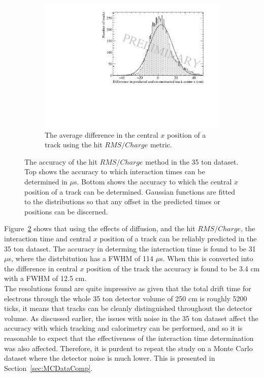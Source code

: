 \begin{figure}[h!]
  \begin{subfigure}{0.6\textwidth}
    \centering
    \includegraphics[width=\textwidth]{Data_AvXPosDiff_RMS_Int}
    \caption{The average difference in the central $x$ position of a track using the hit $RMS/Charge$ metric.}
    \label{fig:DiffDataAvDiff_RMS_Int_X}
  \end{subfigure}
  \caption[The accuracy of the hit $RMS/Charge$ method in the 35 ton dataset]
          {The accuracy of the hit $RMS/Charge$ method in the 35 ton dataset. Top shows the accuracy to which interaction times can be determined in $\mu$s. Bottom shows the accuracy to which the central $x$ position of a track can be determined. Gaussian functions are fitted to the distributions so that any offset in the predicted times or positions can be discerned.}
  \label{fig:DiffDataAvDiff_RMS_Int}
\end{figure}

Figure~\ref{fig:DiffDataAvDiff_RMS_Int} shows that using the effects of diffusion, and the hit $RMS/Charge$, the interaction time and central $x$ position of a track can be reliably predicted in the 35 ton dataset. The accuracy in determing the interaction time is found to be 31 $\mu$s, where the distrbitution has a FWHM of 114 $\mu$s. When this is converted into the difference in central $x$ position of the track the accuracy is found to be 3.4 cm with a FWHM of 12.5 cm. \\

The resolutions found are quite impressive as given that the total drift time for electrons through the whole 35 ton detector volume of 250 cm is roughly 5200 ticks, it means that tracks can be cleanly distinguished throughout the detector volume. As discussed earlier, the issues with noise in the 35 ton dataset affect the accuracy with which tracking and calorimetry can be performed, and so it is reasonable to expect that the effectiveness of the interaction time determination was also affected. Therefore, it is purdent to repeat the study on a Monte Carlo dataset where the detector noise is much lower. This is presented in Section~\ref{sec:MCDataComp}.

